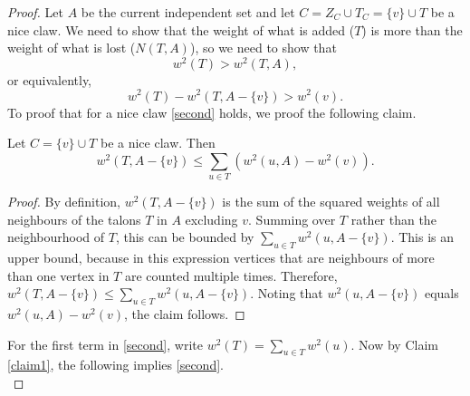 \begin{proof}
Let $A$ be the current independent set and let $C = Z_C \cup T_C = \{v\} \cup T$ be a nice claw. We need to show that the weight of what is added ($T$) is more than the weight of what is lost ($N(T,A)$), so we need to show that
%
\begin{equation}\label{first}
w^2(T) > w^2(T,A),
\end{equation}
%
or equivalently,
%
\begin{equation}\label{second}
w^2(T) - w^2(T,A-\{v\}) > w^2(v).
\end{equation}
%
To proof that for a nice claw \eqref{second} holds, we proof the following claim.
%
\begin{claim}\label{claim1}
Let $C = \{v\} \cup T$ be a nice claw. Then
%
\begin{equation*}
w^2(T,A-\{v\}) \leq \sum_{u \in T} \left( w^2(u,A) - w^2(v) \right).
\end{equation*}
\end{claim}
%
\begin{proof}
By definition, $w^2(T,A-\{v\})$ %
is the sum of the squared weights of all neighbours of the talons $T$ in $A$ excluding $v$.
Summing over $T$ rather than the neighbourhood of $T$, this can be bounded by $\displaystyle \sum_{u \in T} w^2(u,A-\{v\})$. This is an upper bound, because in this expression vertices that are neighbours of more than one vertex in $T$ are counted multiple times. Therefore, $\displaystyle w^2(T,A-\{v\}) \leq \sum_{u \in T} w^2(u,A-\{v\})$. Noting that $w^2(u,A-\{v\})$ equals $w^2(u,A) - w^2(v)$, the claim follows.
\end{proof}
%
For the first term in \eqref{second}, write $w^2(T) = \sum_{u \in T} w^2(u)$. Now by Claim \ref{claim1}, the following implies \eqref{second}.
%
\begin{equation}\label{fourth}

\end{equation}
\end{proof}
